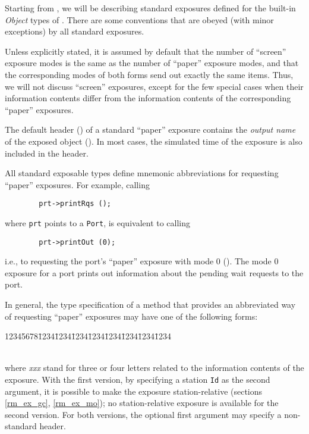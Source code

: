 Starting from , we will be describing
standard exposures defined for the built-in
{\em Object\/} types of \smurph.
There are some conventions that are obeyed (with minor exceptions)
by all standard exposures.

Unless explicitly stated, it is assumed by default that the number of
``screen'' exposure modes is the same as the number of ``paper''
exposure modes, and that the corresponding modes of both forms send
out exactly the same items.
Thus, we will not discuss ``screen'' exposures, except for the few special
cases when their information contents differ from the information
contents of the corresponding ``paper'' exposures.

The default header ()
of a standard ``paper'' exposure contains the {\em output name\/} of the
exposed object ().
In most cases, the simulated time of the exposure is also included in the
header.

All standard exposable types define mnemonic abbreviations for requesting
``paper'' exposures.
For example, calling
\begin{verbatim}
        prt->printRqs ();
\end{verbatim}
where {\tt prt} points to a {\tt Port}, is equivalent to calling
\begin{verbatim}
        prt->printOut (0);
\end{verbatim}
i.e., to requesting the port's ``paper'' exposure with mode 0
().
The mode 0 exposure for a port prints out information about the
pending wait requests to the port.

In general, the type specification of a method that provides an abbreviated
way of requesting ``paper'' exposures may have one of the following forms:
{\tt\begin{tabbing}
12345678\=1234\=1234\=1234\=1234\=1234\=1234\=1234\=1234\kill
{}\\
\\
\end{tabbing}}
where {\em xxx\/} stand for three or four letters related to the information
contents of the exposure.
With the first version, by specifying a station {\tt Id} as
the second argument,
it is possible to make the exposure station-relative
(sections \ref{rm_ex_gc}, \ref{rm_ex_mo}); no station-relative
exposure is available for the second version.
For both versions, the optional first argument may specify a non-standard
header.

